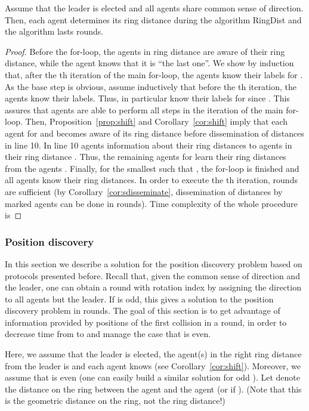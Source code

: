 \begin{lemma}
Assume that the leader is elected and all agents share common sense of direction.
Then, each agent  determines its ring distance during the algorithm RingDist and the
algorithm lasts  rounds.
\end{lemma}
\iffull
\begin{proof}
Before the for-loop, the agents in ring distance  are aware of their ring distance,
while the agent  knows that it is ``the last one''. 
We show by induction that, after the th iteration of the main for-loop, the agents
 know their labels for .
As the base step is obvious, assume inductively that before the th iteration,
the agents  know their labels. Thus, in particular
 know their labels for  since .
This assures that agents are able to perform all steps in the  iteration
of the main for-loop.
Then, Proposition~\ref{prop:shift}
and Corollary~\ref{cor:shift} imply that each agent
 for  and  becomes aware of its ring distance
before dissemination of distances in line 10.
In line 10 agents 
 information about their ring distances to agents in their ring distance
.
Thus, the remaining agents  for  learn their ring distances
from the agents .
Finally, for the smallest  such that , the for-loop
is finished and all agents know their ring distances.
In order to execute the th iteration,  rounds are sufficient
(by Corollary~\ref{cor:sdisseminate}, dissemination of distances by marked agents
can be done in  rounds).
Time complexity of the whole procedure is

\end{proof}
\else
\fi

\subsubsection{Position discovery}
In this section we describe a solution for the position discovery
problem based on protocols presented before.
Recall that, given  the common sense of direction and the leader, one can obtain a round
with rotation index  by assigning the direction  to all agents but the leader.
If  is odd, this gives a solution to the position discovery problem in  rounds.
The goal of this section is to get advantage of information provided by positions of 
the first collision in a round, in order to decrease time from  to  and manage
the case that  is even.

Here, we assume that the leader  is elected, the agent(s) in the right ring distance
 from the leader is  and each agent  knows  (see Corollary~\ref{cor:shift}). Moreover, we assume that
 is even (one can easily build a similar solution for odd ).
Let  denote the distance on the ring between the agent  and the agent 
(or  if ). (Note that this is the geometric distance on the ring, not the ring distance!)



